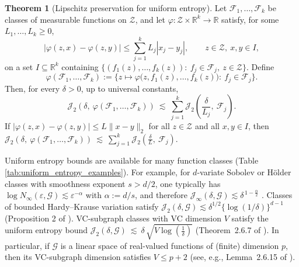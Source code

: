 \documentclass[11pt]{article}
\theoremstyle{plain}
\theoremstyle{definition} %
\newtheorem{theorem}{Theorem}
\begin{document}
\begin{theorem}[Lipschitz preservation for uniform entropy]
\label{theorem:vw_lipschitz_entropy}
Let \(\mathcal F_1,\ldots,\mathcal F_k\) be classes of measurable functions on \(\mathcal Z\), and let
\(\varphi:\mathcal Z\times\mathbb R^k\to\mathbb R\) satisfy, for some \(L_1,\ldots,L_k\ge 0\),
\[
|\varphi(z,x)-\varphi(z,y)| \le \sum_{j=1}^k L_j |x_j-y_j|,
\qquad z\in\mathcal Z,\ x,y\in I,
\]
on a set \(I\subseteq\mathbb R^k\) containing
\(\{(f_1(z),\ldots,f_k(z)):\ f_j\in\mathcal F_j,\ z\in\mathcal Z\}\). Define
\[
\varphi(\mathcal F_1,\ldots,\mathcal F_k)
:=
\bigl\{z\mapsto \varphi\bigl(z,f_1(z),\ldots,f_k(z)\bigr):\ f_j\in\mathcal F_j\bigr\}.
\]
Then, for every \(\delta>0\), up to universal constants,
\[
\mathcal J_2\left(\delta,\ \varphi(\mathcal F_1,\ldots,\mathcal F_k)\right)
\ \lesssim\
\sum_{j=1}^k \mathcal J_2\left(\frac{\delta}{L_j},\ \mathcal F_j\right).
\]
If \(|\varphi(z,x)-\varphi(z,y)| \le L\|x-y\|_2\) for all \(z\in\mathcal Z\) and all \(x,y\in I\), then $\mathcal J_2\left(\delta,\ \varphi(\mathcal F_1,\ldots,\mathcal F_k)\right)
\ \lesssim\
\sum_{j=1}^k \mathcal J_2\left(\frac{\delta}{L},\ \mathcal F_j\right).$
\end{theorem}



Uniform entropy bounds are available for many function classes (Table \ref{tab:uniform_entropy_examples}). For example, for \(d\)-variate Sobolev or H\"older classes with smoothness exponent \(s>d/2\), one typically has
\(\log N_{\infty}(\varepsilon,\mathcal{G}) \lesssim \varepsilon^{-\alpha}\) with \(\alpha := d/s\), and therefore
\(\mathcal{J}_{\infty}(\delta,\mathcal{G}) \lesssim \delta^{\,1-\frac{\alpha}{2}}\)
\citep{van1996weak,nickl2007bracketing}. Classes of bounded Hardy--Krause variation satisfy
\(\mathcal{J}_{2}(\delta,\mathcal{G}) \lesssim \delta^{1/2}\{\log(1/\delta)\}^{d-1}\)
(Proposition 2 of \citealp{bibaut2019fast}). VC-subgraph classes with VC dimension $V$ satisfy the uniform entropy bound $\mathcal{J}_2(\delta,\mathcal{G})
\ \lesssim\
\delta\,\sqrt{V\log\left(\frac{1}{\delta}\right)} $ (Theorem~2.6.7 of \citealp{van1996weak}). In particular, if $\mathcal{G}$ is a linear space of real-valued functions of (finite) dimension $p$, then its VC-subgraph dimension satisfies $V\leq p + 2$ (see, e.g., Lemma~2.6.15 of \citealp{van1996weak}).
\end{document}
